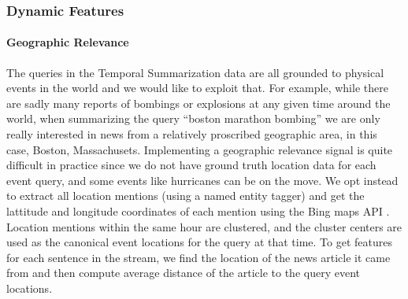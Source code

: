 \subsubsection{Dynamic Features}
\paragraph{Geographic Relevance} 
The queries in the Temporal Summarization data are all grounded to physical
events in the world and we would like to exploit that. For example, while
there are sadly many reports of bombings or explosions at any given time 
around the world, when summarizing the query ``boston marathon bombing'' 
we are only really interested in news from a relatively proscribed 
geographic area, in this case, Boston, Massachusets. Implementing 
a geographic relevance signal is quite difficult in practice since 
we do not have ground truth location data for each event query, and some
events like hurricanes can be on the move. We opt instead to extract all
location mentions (using a named entity tagger) and get the lattitude
and longitude coordinates
of each mention using the Bing maps API \citep{bingmaps}. Location
mentions within the same hour are clustered, and the cluster centers are 
used as the canonical event locations for the query at that time. 
To get features for each sentence in the stream, we find the location of
the news article it came from and then compute average distance of the 
article to the query event locations.




